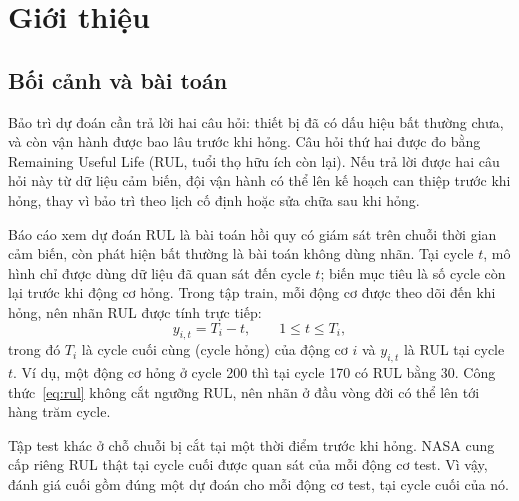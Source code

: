 \section{Giới thiệu}
\label{sec:intro}

\subsection{Bối cảnh và bài toán}
Bảo trì dự đoán cần trả lời hai câu hỏi: thiết bị đã có dấu hiệu bất thường
chưa, và còn vận hành được bao lâu trước khi hỏng. Câu hỏi thứ hai được đo bằng
Remaining Useful Life (RUL, tuổi thọ hữu ích còn lại). Nếu trả lời được hai câu
hỏi này từ dữ liệu cảm biến, đội vận hành có thể lên kế hoạch can thiệp trước khi
hỏng, thay vì bảo trì theo lịch cố định hoặc sửa chữa sau khi hỏng.

Báo cáo xem dự đoán RUL là bài toán hồi quy có giám sát trên chuỗi thời gian
cảm biến, còn phát hiện bất thường là bài toán không dùng nhãn. Tại cycle $t$, mô hình chỉ được dùng dữ liệu đã quan sát đến cycle
$t$; biến mục tiêu là số cycle còn lại trước khi động cơ hỏng. Trong tập train,
mỗi động cơ được theo dõi đến khi hỏng, nên nhãn RUL được tính trực tiếp:
\begin{equation}
 y_{i,t}=T_i-t,\qquad 1\leq t\leq T_i,
 \label{eq:rul}
\end{equation}
trong đó $T_i$ là cycle cuối cùng (cycle hỏng) của động cơ $i$ và $y_{i,t}$ là
RUL tại cycle $t$. Ví dụ, một động cơ hỏng ở cycle 200 thì tại cycle 170 có
RUL bằng 30. Công thức~\eqref{eq:rul} không cắt ngưỡng RUL, nên nhãn ở đầu vòng
đời có thể lên tới hàng trăm cycle.

Tập test khác ở chỗ chuỗi bị cắt tại một thời điểm trước khi hỏng. NASA cung
cấp riêng RUL thật tại cycle cuối được quan sát của mỗi động cơ test. Vì vậy,
đánh giá cuối gồm đúng một dự đoán cho mỗi động cơ test, tại cycle cuối của nó.

